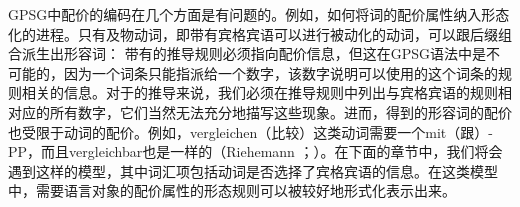 GPSG中配价的编码在几个方面是有问题的。例如，如何将词的配价属性纳入形态化的进程。只有及物动词，即带有宾格宾语可以进行被动化的动词，可以跟后缀组合派生出形容词：
\eal\settowidth{}
\zl
带有的推导规则必须指向配价信息，但这在GPSG语法中是不可能的，因为一个词条只能指派给一个数字，该数字说明可以使用的这个词条的规则相关的信息。对于的推导来说，我们必须在推导规则中列出与宾格宾语的规则相对应的所有数字，它们当然无法充分地描写这些现象。进而，得到的形容词的配价也受限于动词的配价。例如，vergleichen（比较）这类动词需要一个mit（跟）-PP，而且vergleichbar也是一样的（Riehemann \citeyear[, 54]{Riehemann93a}；\citeyear[]{Riehemann98a}）。在下面的章节中，我们将会遇到这样的模型，其中词汇项包括动词是否选择了宾格宾语的信息。在这类模型中，需要语言对象的配价属性的形态规则可以被较好地形式化表示出来。

